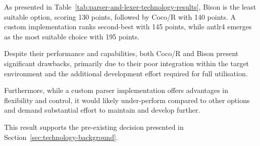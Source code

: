As presented in Table~\ref{tab:parser-and-lexer-technology-results}, Bison is the least suitable option, scoring 130 points, followed by Coco/R with 140 points. A custom implementation ranks second-best with 145 points, while \Gls{antlr4} emerges as the most suitable choice with 195 points.

Despite their performance and capabilities, both Coco/R and Bison present significant drawbacks, primarily due to their poor integration within the target environment and the additional development effort required for full utilisation. 

Furthermore, while a custom parser implementation offers advantages in flexibility and control, it would likely under-perform compared to other options and demand substantial effort to maintain and develop further.

This result supports the pre-existing decision presented in Section~\ref{sec:technology-background}.

